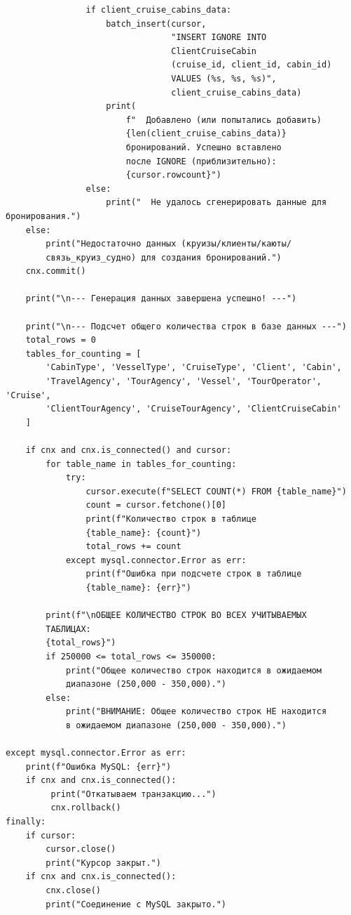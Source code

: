 \documentclass[11pt,a4paper,final]{article}
\begin{document}
{\begin{verbatim}
                if client_cruise_cabins_data:
                    batch_insert(cursor,
                                 "INSERT IGNORE INTO 
                                 ClientCruiseCabin
                                 (cruise_id, client_id, cabin_id) 
                                 VALUES (%s, %s, %s)",
                                 client_cruise_cabins_data)
                    print(
                        f"  Добавлено (или попытались добавить) 
                        {len(client_cruise_cabins_data)}
                        бронирований. Успешно вставлено
                        после IGNORE (приблизительно):
                        {cursor.rowcount}")
                else:
                    print("  Не удалось сгенерировать данные для бронирования.")
    else:
        print("Недостаточно данных (круизы/клиенты/каюты/
        связь_круиз_судно) для создания бронирований.")
    cnx.commit()

    print("\n--- Генерация данных завершена успешно! ---")

    print("\n--- Подсчет общего количества строк в базе данных ---")
    total_rows = 0
    tables_for_counting = [
        'CabinType', 'VesselType', 'CruiseType', 'Client', 'Cabin', 
        'TravelAgency', 'TourAgency', 'Vessel', 'TourOperator', 'Cruise',
        'ClientTourAgency', 'CruiseTourAgency', 'ClientCruiseCabin'
    ]

    if cnx and cnx.is_connected() and cursor:
        for table_name in tables_for_counting:
            try:
                cursor.execute(f"SELECT COUNT(*) FROM {table_name}")
                count = cursor.fetchone()[0]
                print(f"Количество строк в таблице 
                {table_name}: {count}")
                total_rows += count
            except mysql.connector.Error as err:
                print(f"Ошибка при подсчете строк в таблице 
                {table_name}: {err}")

        print(f"\nОБЩЕЕ КОЛИЧЕСТВО СТРОК ВО ВСЕХ УЧИТЫВАЕМЫХ
        ТАБЛИЦАХ:
        {total_rows}")
        if 250000 <= total_rows <= 350000:
            print("Общее количество строк находится в ожидаемом 
            диапазоне (250,000 - 350,000).")
        else:
            print("ВНИМАНИЕ: Общее количество строк НЕ находится
            в ожидаемом диапазоне (250,000 - 350,000).")

except mysql.connector.Error as err:
    print(f"Ошибка MySQL: {err}")
    if cnx and cnx.is_connected():
         print("Откатываем транзакцию...")
         cnx.rollback()
finally:
    if cursor:
        cursor.close()
        print("Курсор закрыт.")
    if cnx and cnx.is_connected():
        cnx.close()
        print("Соединение с MySQL закрыто.")
\end{verbatim}
}
\end{document}
